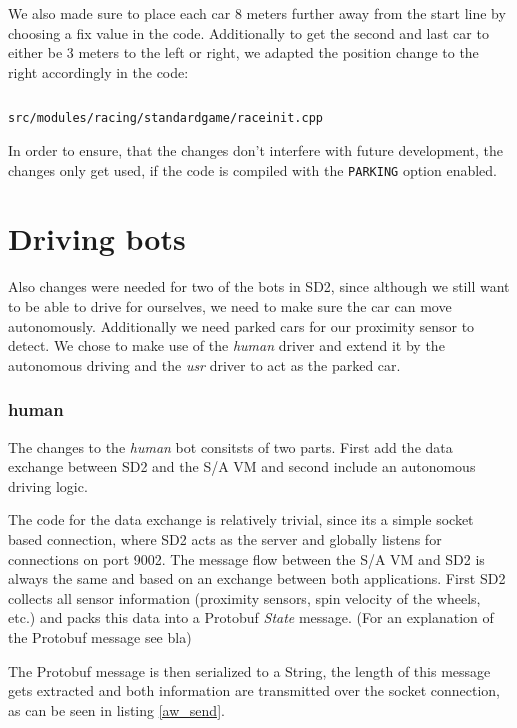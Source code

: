 \documentclass[paper=a4, fontsize=11pt]{scrreprt}
\begin{document}
We also made sure to place each car 8 meters further away from the start line by choosing a fix value in the code.
Additionally to get the second and last car to either be 3 meters to the left or right,
we adapted the position change to the right accordingly in the code:
\begin{listing}[ht]
  \inputminted[firstline=316,linenos=true,lastline=327,gobble=4]{c++}{../../../simulators/speed-dreams/src/modules/racing/standardgame/raceinit.cpp}
  \caption{\texttt{src/modules/racing/standardgame/raceinit.cpp}}
\end{listing}

In order to ensure, that the changes don't interfere with future development,
the changes only get used, if the code is compiled with the \texttt{PARKING} option enabled.

\section{Driving bots}
Also changes were needed for two of the bots in SD2,
since although we still want to be able to drive for ourselves,
we need to make sure the car can move autonomously.
Additionally we need parked cars for our proximity sensor to detect.
We chose to make use of the \textit{human} driver and extend it by the autonomous driving
and the \textit{usr} driver to act as the parked car.

\subsubsection{human}
The changes to the \textit{human} bot consitsts of two parts.
First add the data exchange between SD2 and the S/A VM
and second include an autonomous driving logic.

The code for the data exchange is relatively trivial,
since its a simple socket based connection,
where SD2 acts as the server and globally listens for connections on port 9002.
The message flow between the S/A VM and SD2 is always the same
and based on an exchange between both applications.
First SD2 collects all sensor information (proximity sensors, spin velocity of the wheels, etc.)
and packs this data into a Protobuf \textit{State} message.
(For an explanation of the Protobuf message see bla) %

The Protobuf message is then serialized to a String,
the length of this message gets extracted
and both information are transmitted over the socket connection,
as can be seen in listing \ref{aw_send}.
\end{document}
